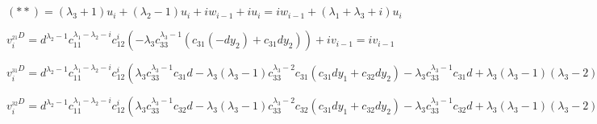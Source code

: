 \\
\\
$ (**) = (\lambda_3 + 1) u_i + (\lambda_2 - 1) u_i + i w_{i - 1} + i u_i = 
i w_{i - 1} + (\lambda_1 + \lambda_3 + i) u_i $
\newline

%
%
$ v_i^{_{21}D} = d^{\lambda_2 - 1} c_{11}^{\lambda_1 - \lambda_2 - i} c_{12}^i (- \lambda_3 c_{33}^{\lambda_3 - 1} (c_{31} (-d y_2) + c_{31} d y_2)) + i v_{i - 1} = i v_{i - 1} $
\newline

%
%
$ v_i^{_{31}D} = d^{\lambda_2 - 1} c_{11}^{\lambda_1 - \lambda_2 - i} c_{12}^i (\lambda_3 c_{33}^{\lambda_3 - 1} c_{31} d - \lambda_3 (\lambda_3 - 1) c_{33}^{\lambda_3 - 2} c_{31} (c_{31} d y_1 + c_{32} d y_2) - \lambda_3 c_{33}^{\lambda_3 - 1} c_{31} d + \lambda_3 (\lambda_3 - 1) (\lambda_3 - 2) c_{33}^{\lambda_3 - 3} c_{31}c_{31}c_{13}c_{32}c_{23} + \lambda_3 (\lambda_3 - 1) c_{33}^{\lambda_3 - 2} (c_{31}c_{11}c_{32}c_{23} + c_{31}c_{13}c_{32}c_{21})) = d^{\lambda_2 - 1} c_{11}^{\lambda_1 - \lambda_2 - i} c_{12}^i (- \lambda_3 (\lambda_3 - 1) c_{33}^{\lambda_3 - 2} c_{31} c_{32} d y_2  + \lambda_3 (\lambda_3 - 1) c_{33}^{\lambda_3 - 2} c_{31}c_{32}(c_{11}c_{23} - c_{13}c_{21})) = 0 $
\newline

%
%
$  v_i^{_{32}D} = d^{\lambda_2 - 1} c_{11}^{\lambda_1 - \lambda_2 - i} c_{12}^i (\lambda_3 c_{33}^{\lambda_3 - 1} c_{32} d - \lambda_3 (\lambda_3 - 1) c_{33}^{\lambda_3 - 2} c_{32} (c_{31} d y_1 + c_{32} d y_2) - \lambda_3 c_{33}^{\lambda_3 - 1} c_{32} d + \lambda_3 (\lambda_3 - 1) (\lambda_3 - 2) c_{33}^{\lambda_3 - 3} c_{32}c_{31}c_{13}c_{32}c_{23} + \lambda_3 (\lambda_3 - 1) c_{33}^{\lambda_3 - 2} (c_{31}c_{12}c_{32}c_{23} + c_{31}c_{13}c_{32}c_{22})) = d^{\lambda_2 - 1} c_{11}^{\lambda_1 - \lambda_2 - i} c_{12}^i (- \lambda_3 (\lambda_3 - 1) c_{33}^{\lambda_3 - 2} c_{32} c_{31} d y_1  + \lambda_3 (\lambda_3 - 1) c_{33}^{\lambda_3 - 2} c_{32}c_{31}(c_{13}c_{22} - c_{12}c_{23})) = 0 $
